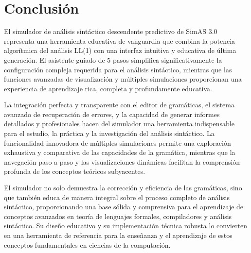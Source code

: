\section{Conclusión}

El simulador de análisis sintáctico descendente predictivo de SimAS 3.0 representa una herramienta educativa de vanguardia que combina la potencia algorítmica del análisis LL(1) con una interfaz intuitiva y educativa de última generación. El asistente guiado de 5 pasos simplifica significativamente la configuración compleja requerida para el análisis sintáctico, mientras que las funciones avanzadas de visualización y múltiples simulaciones proporcionan una experiencia de aprendizaje rica, completa y profundamente educativa.

La integración perfecta y transparente con el editor de gramáticas, el sistema avanzado de recuperación de errores, y la capacidad de generar informes detallados y profesionales hacen del simulador una herramienta indispensable para el estudio, la práctica y la investigación del análisis sintáctico. La funcionalidad innovadora de múltiples simulaciones permite una exploración exhaustiva y comparativa de las capacidades de la gramática, mientras que la navegación paso a paso y las visualizaciones dinámicas facilitan la comprensión profunda de los conceptos teóricos subyacentes.

El simulador no solo demuestra la corrección y eficiencia de las gramáticas, sino que también educa de manera integral sobre el proceso completo de análisis sintáctico, proporcionando una base sólida y comprensiva para el aprendizaje de conceptos avanzados en teoría de lenguajes formales, compiladores y análisis sintáctico. Su diseño educativo y su implementación técnica robusta lo convierten en una herramienta de referencia para la enseñanza y el aprendizaje de estos conceptos fundamentales en ciencias de la computación.


